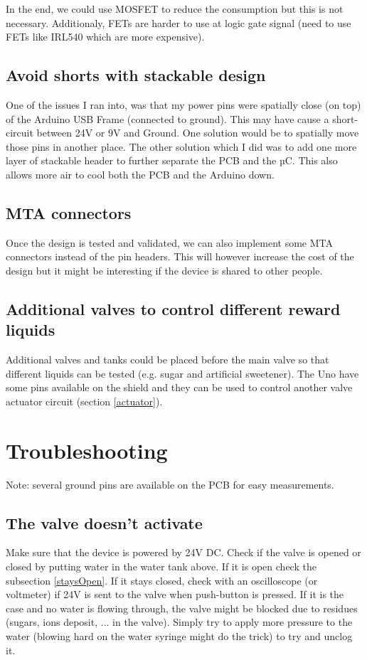 \documentclass[a4paper]{article}
\begin{document}
In the end, we could use MOSFET to reduce the consumption but this is not necessary.
Additionaly, FETs are harder to use at logic gate signal (need to use FETs like IRL540 which are more expensive).

\subsection{Avoid shorts with stackable design}
One of the issues I ran into, was that my power pins were spatially close (on top) of the Arduino USB Frame (connected to ground). This may have cause a short-circuit between 24V or 9V and Ground. One solution would be to spatially move those pins in another place.
The other solution which I did was to add one more layer of stackable header to further separate the PCB and the µC. This also allows more air to cool both the PCB and the Arduino down.

\subsection{MTA connectors}
Once the design is tested and validated, we can also implement some MTA connectors instead of the pin headers. This will however increase the cost of the design but it might be interesting if the device is shared to other people.

\subsection{Additional valves to control different reward liquids}
Additional valves and tanks could be placed before the main valve so that different liquids can be tested (e.g. sugar and artificial sweetener).
The Uno have some pins available on the shield and they can be used to control another valve actuator circuit (section \ref{actuator}).

\newpage
\section{Troubleshooting}
Note: several ground pins are available on the PCB for easy measurements.
\subsection{The valve doesn't activate}
Make sure that the device is powered by 24V DC.
Check if the valve is opened or closed by putting water in the water tank above.
If it is open check the subsection \ref{staysOpen}.
If it stays closed, check with an oscilloscope (or voltmeter) if 24V is sent to the valve when push-button is pressed. If it is the case and no water is flowing through, the valve might be blocked due to residues (sugars, ions deposit, ... in the valve). Simply try to apply more pressure to the water (blowing hard on the water syringe might do the trick) to try and unclog it.
\end{document}
